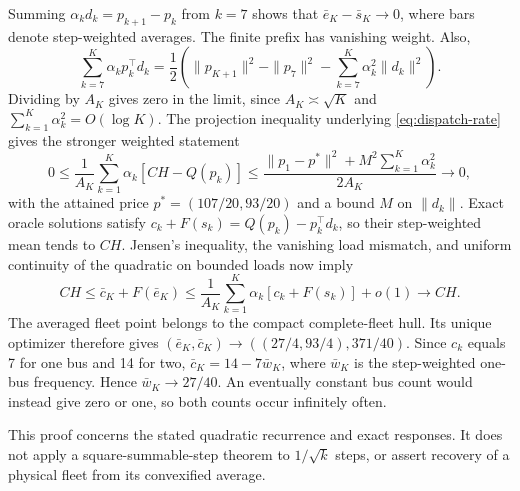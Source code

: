 Summing $\alpha_kd_k=p_{k+1}-p_k$ from $k=7$ shows that
$\bar e_K-\bar s_K\to0$, where bars denote step-weighted averages.
The finite prefix has vanishing weight. Also,
\[
 \sum_{k=7}^K\alpha_kp_k^\top d_k
 =\frac12\left(\|p_{K+1}\|^2-\|p_7\|^2
                  -\sum_{k=7}^K\alpha_k^2\|d_k\|^2\right).
\]
Dividing by $A_K$ gives zero in the limit, since
$A_K\asymp\sqrt K$ and $\sum_{k=1}^K\alpha_k^2=O(\log K)$.
The projection inequality underlying \eqref{eq:dispatch-rate} gives the
stronger weighted statement
\[
 0\le\frac1{A_K}\sum_{k=1}^K\alpha_k[CH-Q(p_k)]
 \le\frac{\|p_1-p^*\|^2+M^2\sum_{k=1}^K\alpha_k^2}{2A_K}
 \longrightarrow0,
\]
with the attained price $p^*=(107/20,93/20)$ and a bound $M$ on
$\|d_k\|$. Exact oracle solutions satisfy
$c_k+F(s_k)=Q(p_k)-p_k^\top d_k$, so their step-weighted mean tends
to $CH$. Jensen's inequality, the vanishing load mismatch, and uniform
continuity of the quadratic on bounded loads now imply
\[
 CH\le\bar c_K+F(\bar e_K)
 \le\frac1{A_K}\sum_{k=1}^K\alpha_k[c_k+F(s_k)]+o(1)
 \longrightarrow CH.
\]
The averaged fleet point belongs to the compact complete-fleet hull.
Its unique optimizer therefore gives
$(\bar e_K,\bar c_K)\to((27/4,93/4),371/40)$.
Since $c_k$ equals 7 for one bus and 14 for two,
$\bar c_K=14-7\bar w_K$, where $\bar w_K$ is the step-weighted one-bus
frequency. Hence $\bar w_K\to27/40$. An eventually constant bus count
would instead give zero or one, so both counts occur infinitely often.

This proof concerns the stated quadratic recurrence and exact responses.
It does not apply a square-summable-step theorem to $1/\sqrt{k}$ steps,
or assert recovery of a physical fleet from its convexified average.
